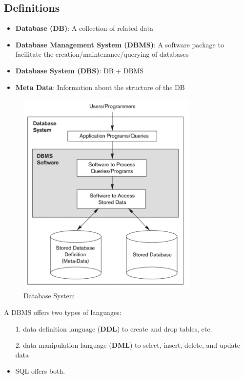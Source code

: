 \subsection{Definitions}
\begin{itemize}
    \item \textbf{Database (DB)}: A collection of related data
    \item \textbf{Database Management System (DBMS)}: A software package to facilitate the creation/maintenance/querying of databases
    \item \textbf{Database System (DBS)}: DB + DBMS
    \item \textbf{Meta Data}: Information about the structure of the DB
\end{itemize}

\begin{figure}[H]
\centering
\includegraphics[width=0.8\textwidth]{images/Screenshot 2024-05-01 at 17.02.18.jpg}
\caption{Database System}
\end{figure}

A DBMS offers two types of languages:
\begin{itemize}
    \item[1.] data definition language (\textbf{DDL}) to create and drop tables, etc.
    \item[2.] data manipulation language (\textbf{DML}) to select, insert, delete, and update data 
    \item SQL offers both.
\end{itemize}

